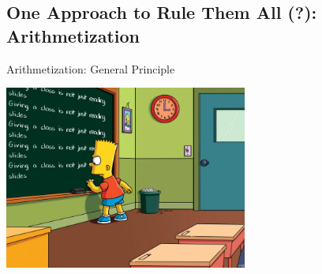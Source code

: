 \documentclass[presentation,aspectratio=1610]{beamer}
\begin{document}
\subsection{One Approach to Rule Them All (?): Arithmetization}


\begin{frame}{Arithmetization: General Principle}
  \begin{center}
    \includegraphics[width=8cm]{./figures/simpsons}
  \end{center}
\end{frame}
\end{document}
